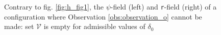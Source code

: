 \begin{figure}
  
  \vspace{1cm}
  \caption{\small Contrary to fig. \ref{fig:h_fig1}, the $\psi$-field (left)
           and \texttt{r}-field (right) of a configuration where Observation
           \ref{obs:observation_o} cannot be made: set $\mathcal{V}$ is
           empty for admissible values of $\delta_0$}
  \label{fig:h_not_fig1}
\end{figure}
